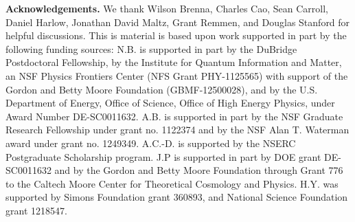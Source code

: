 \documentclass[a4paper,11pt]{article}
\theoremstyle{definition}
\begin{document}
\vspace{10pt}
\medskip
\medskip

\noindent \textbf{Acknowledgements.} We thank Wilson Brenna, Charles Cao, Sean Carroll, Daniel Harlow, Jonathan David Maltz, Grant Remmen, and Douglas Stanford for helpful discussions.
This is material is based upon work supported in part by the following funding sources:
N.B. is supported in part by the DuBridge Postdoctoral Fellowship, by the Institute for Quantum Information and Matter, an NSF Physics Frontiers Center (NFS Grant PHY-1125565) with support of the Gordon and Betty Moore Foundation (GBMF-12500028), and by the U.S. Department of Energy, Office of Science, Office of High Energy Physics, under Award Number DE-SC0011632.
A.B. is supported in part by the NSF Graduate Research Fellowship under grant no. 1122374 and by the NSF Alan T. Waterman award under grant no. 1249349.
A.C.-D. is supported by the NSERC Postgraduate Scholarship program.
J.P is supported in part by DOE grant DE-SC0011632 and by the Gordon and Betty Moore Foundation through Grant 776 to the Caltech Moore Center for Theoretical Cosmology and Physics.
H.Y. was supported by Simons Foundation
grant 360893, and National Science Foundation grant 1218547.
 
\end{document}

